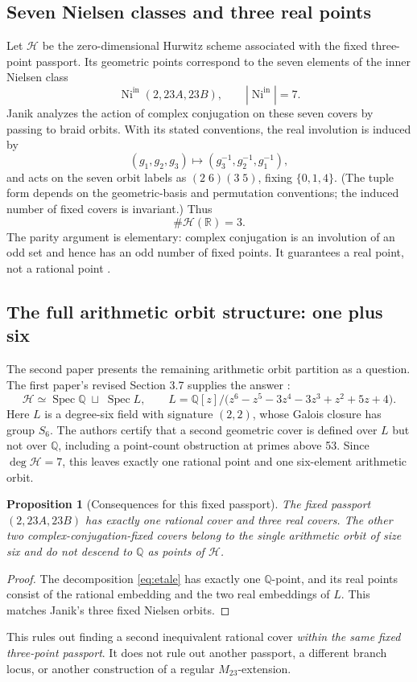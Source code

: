 \documentclass[11pt,letterpaper]{article}
\newtheorem{proposition}[theorem]{Proposition}
\theoremstyle{definition}
\newcommand{\QQ}{\mathbb{Q}}
\newcommand{\Ni}{\operatorname{Ni}}
\newcommand{\Spec}{\operatorname{Spec}}
\newcommand{\HH}{\mathscr{H}}
\begin{document}
\subsection{Seven Nielsen classes and three real points}
Let \(\HH\) be the zero-dimensional Hurwitz scheme associated with the fixed three-point passport. Its geometric points correspond to the seven elements of the inner Nielsen class
\[
\Ni^{\mathrm{in}}(2,23A,23B),\qquad |\Ni^{\mathrm{in}}|=7.
\]
Janik \cite{Janik26} analyzes the action of complex conjugation on these seven covers by passing to braid orbits. With its stated conventions, the real involution is induced by
\[
(g_1,g_2,g_3)\longmapsto(g_3^{-1},g_2^{-1},g_1^{-1}),
\]
and acts on the seven orbit labels as \((2\;6)(3\;5)\), fixing \(\{0,1,4\}\). (The tuple form depends on the geometric-basis and permutation conventions; the induced number of fixed covers is invariant.) Thus
\[
\#\HH(\mathbb R)=3.
\]
The parity argument is elementary: complex conjugation is an involution of an odd set and hence has an odd number of fixed points. It guarantees a real point, not a rational point \cite[\S\S3--5]{Janik26}.

\subsection{The full arithmetic orbit structure: one plus six}
The second paper presents the remaining arithmetic orbit partition as a question. The first paper's revised Section 3.7 supplies the answer \cite[\S3.7, Proposition 3.14]{HJLPPZ26}:
\begin{equation}\label{eq:etale}
\HH\simeq \Spec\QQ\;\sqcup\;\Spec L,
\qquad
L=\QQ[z]/\bigl(z^6-z^5-3z^4-3z^3+z^2+5z+4\bigr).
\end{equation}
Here \(L\) is a degree-six field with signature \((2,2)\), whose Galois closure has group \(S_6\). The authors certify that a second geometric cover is defined over \(L\) but not over \(\QQ\), including a point-count obstruction at primes above 53. Since \(\deg\HH=7\), this leaves exactly one rational point and one six-element arithmetic orbit.

\begin{proposition}[Consequences for this fixed passport]
The fixed passport \((2,23A,23B)\) has exactly one rational cover and three real covers. The other two complex-conjugation-fixed covers belong to the single arithmetic orbit of size six and do not descend to \(\QQ\) as points of \(\HH\).
\end{proposition}
\begin{proof}
The decomposition \eqref{eq:etale} has exactly one \(\QQ\)-point, and its real points consist of the rational embedding and the two real embeddings of \(L\). This matches Janik's three fixed Nielsen orbits.
\end{proof}
This rules out finding a second inequivalent rational cover \emph{within the same fixed three-point passport}. It does not rule out another passport, a different branch locus, or another construction of a regular \(M_{23}\)-extension.
\end{document}
